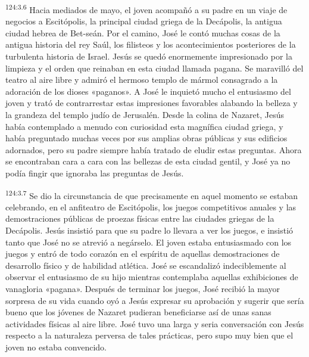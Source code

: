 \par
\textsuperscript{124:3.6} Hacia mediados de mayo, el joven acompañó a su padre en un viaje de negocios a Escitópolis, la principal ciudad griega de la Decápolis, la antigua ciudad hebrea de Bet-seán. Por el camino, José le contó muchas cosas de la antigua historia del rey Saúl, los filisteos y los acontecimientos posteriores de la turbulenta historia de Israel. Jesús se quedó enormemente impresionado por la limpieza y el orden que reinaban en esta ciudad llamada pagana. Se maravilló del teatro al aire libre y admiró el hermoso templo de mármol consagrado a la adoración de los dioses «paganos». A José le inquietó mucho el entusiasmo del joven y trató de contrarrestar estas impresiones favorables alabando la belleza y la grandeza del templo judío de Jerusalén. Desde la colina de Nazaret, Jesús había contemplado a menudo con curiosidad esta magnífica ciudad griega, y había preguntado muchas veces por sus amplias obras públicas y sus edificios adornados, pero su padre siempre había tratado de eludir estas preguntas. Ahora se encontraban cara a cara con las bellezas de esta ciudad gentil, y José ya no podía fingir que ignoraba las preguntas de Jesús.

\par
\textsuperscript{124:3.7} Se dio la circunstancia de que precisamente en aquel momento se estaban celebrando, en el anfiteatro de Escitópolis, los juegos competitivos anuales y las demostraciones públicas de proezas físicas entre las ciudades griegas de la Decápolis. Jesús insistió para que su padre lo llevara a ver los juegos, e insistió tanto que José no se atrevió a negárselo. El joven estaba entusiasmado con los juegos y entró de todo corazón en el espíritu de aquellas demostraciones de desarrollo físico y de habilidad atlética. José se escandalizó indeciblemente al observar el entusiasmo de su hijo mientras contemplaba aquellas exhibiciones de vanagloria «pagana». Después de terminar los juegos, José recibió la mayor sorpresa de su vida cuando oyó a Jesús expresar su aprobación y sugerir que sería bueno que los jóvenes de Nazaret pudieran beneficiarse así de unas sanas actividades físicas al aire libre. José tuvo una larga y seria conversación con Jesús respecto a la naturaleza perversa de tales prácticas, pero supo muy bien que el joven no estaba convencido.

